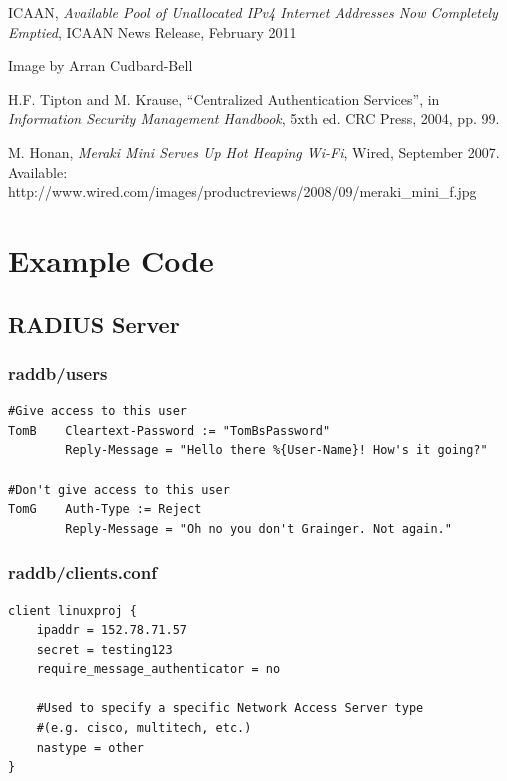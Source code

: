 \documentclass[12pt,a4paper,titlepage]{article}
\begin{document}
\newpage
\begin{thebibliography}{99}

 ICAAN, \textit{Available Pool of Unallocated IPv4 Internet Addresses Now Completely Emptied}, ICAAN News Release, February 2011

 Image by Arran Cudbard-Bell

H.F. Tipton and M. Krause, ``Centralized Authentication Services'', in \textit{Information Security Management Handbook}, 5xth ed. CRC Press, 2004, pp. 99.

M. Honan, \textit{Meraki Mini Serves Up Hot Heaping Wi-Fi}, Wired, September 2007. Available: http://www.wired.com/images/productreviews/2008/09/meraki\_mini\_f.jpg

\end{thebibliography}

\newpage
\appendix
\section{Example Code}

\subsection{RADIUS Server}
\label{sec:Code;sub:radius}

\subsubsection{raddb/users}
\begin{Verbatim}[frame=single]
#Give access to this user
TomB    Cleartext-Password := "TomBsPassword"
        Reply-Message = "Hello there %{User-Name}! How's it going?"

#Don't give access to this user
TomG    Auth-Type := Reject
        Reply-Message = "Oh no you don't Grainger. Not again."
\end{Verbatim}

\subsubsection{raddb/clients.conf}
\begin{Verbatim}[frame=single]
client linuxproj {
    ipaddr = 152.78.71.57
    secret = testing123
    require_message_authenticator = no
    
    #Used to specify a specific Network Access Server type
    #(e.g. cisco, multitech, etc.)
    nastype = other
}
\end{Verbatim}
\end{document}

